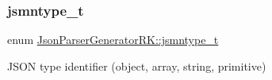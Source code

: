 \mbox{\label{namespace_json_parser_generator_r_k_a45d8af9d310679633d258ed9b2caeeb3}} 
\subsubsection{\texorpdfstring{jsmntype\+\_\+t}{jsmntype\_t}}
{\footnotesize\ttfamily enum \hyperlink{namespace_json_parser_generator_r_k_a45d8af9d310679633d258ed9b2caeeb3}{Json\+Parser\+Generator\+R\+K\+::jsmntype\+\_\+t}}



J\+S\+ON type identifier (object, array, string, primitive) 

